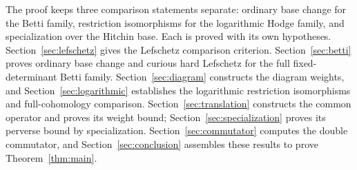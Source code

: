 The proof keeps three comparison statements separate: ordinary base change for the Betti family, restriction isomorphisms for the logarithmic Hodge family, and specialization over the Hitchin base. Each is proved with its own hypotheses. Section~\ref{sec:lefschetz} gives the Lefschetz comparison criterion. Section~\ref{sec:betti} proves ordinary base change and curious hard Lefschetz for the full fixed-determinant Betti family. Section~\ref{sec:diagram} constructs the diagram weights, and Section~\ref{sec:logarithmic} establishes the logarithmic restriction isomorphisms and full-cohomology comparison. Section~\ref{sec:translation} constructs the common operator and proves its weight bound; Section~\ref{sec:specialization} proves its perverse bound by specialization. Section~\ref{sec:commutator} computes the double commutator, and Section~\ref{sec:conclusion} assembles these results to prove Theorem~\ref{thm:main}.
